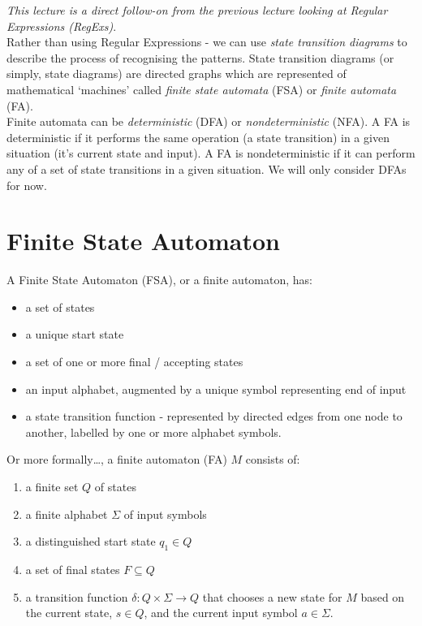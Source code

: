 
\textit{This lecture is a direct follow-on from the previous lecture looking at Regular Expressions (RegExs)}.\\

Rather than using Regular Expressions - we can use \textit{state transition diagrams} to describe the process of recognising the patterns. State transition diagrams (or simply, state diagrams) are directed graphs which are represented of mathematical `machines' called \textit{finite state automata} (FSA) or \textit{finite automata} (FA). \\

Finite automata can be \textit{deterministic} (DFA) or \textit{nondeterministic} (NFA). A FA is deterministic if it performs the same operation (a state transition) in a given situation (it's current state and input). A FA is nondeterministic if it can perform any of a set of state transitions in a given situation. We will only consider DFAs for now.

\section{Finite State Automaton}
A Finite State Automaton (FSA), or a finite automaton, has:
\begin{itemize}
    \item a set of states
    \item a unique start state
    \item a set of one or more final / accepting states
    \item an input alphabet, augmented by a unique symbol representing end of input
    \item a state transition function - represented by directed edges from one node to another, labelled by one or more alphabet symbols. 
\end{itemize}

Or more formally\ldots, a finite automaton (FA) $M$ consists of:
\begin{enumerate}
    \item a finite set $Q$ of states
    \item a finite alphabet $\Sigma$ of input symbols
    \item a distinguished start state $q_1 \in Q$
    \item a set of final states $F \subseteq Q$
    \item a transition function $\delta : Q \times \Sigma \rightarrow Q$ that chooses a new state for $M$ based on the current state, $s \in Q$, and the current input symbol $a \in \Sigma$.
\end{enumerate}

